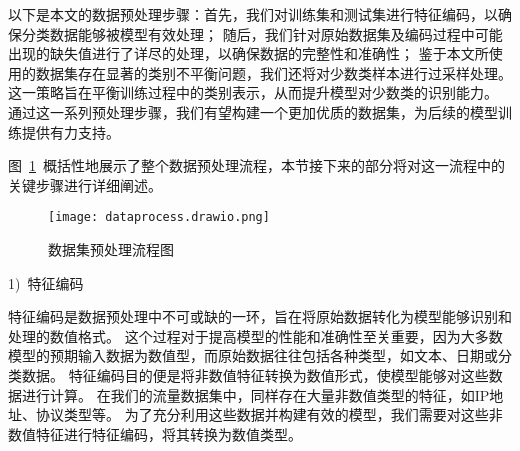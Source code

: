 以下是本文的数据预处理步骤：首先，我们对训练集和测试集进行特征编码，以确保分类数据能够被模型有效处理；
随后，我们针对原始数据集及编码过程中可能出现的缺失值进行了详尽的处理，以确保数据的完整性和准确性；
鉴于本文所使用的数据集存在显著的类别不平衡问题，我们还将对少数类样本进行过采样处理。
这一策略旨在平衡训练过程中的类别表示，从而提升模型对少数类的识别能力。
通过这一系列预处理步骤，我们有望构建一个更加优质的数据集，为后续的模型训练提供有力支持。\par

图~\ref{fig:dataprocess}~概括性地展示了整个数据预处理流程，本节接下来的部分将对这一流程中的关键步骤进行详细阐述。
\begin{figure}[htbp]
	\centering
	\texttt{[image: dataprocess.drawio.png]}
	\caption{数据集预处理流程图}
	\label{fig:dataprocess}
\end{figure}

1)~特征编码\par

特征编码是数据预处理中不可或缺的一环，旨在将原始数据转化为模型能够识别和处理的数值格式。
这个过程对于提高模型的性能和准确性至关重要，因为大多数模型的预期输入数据为数值型，而原始数据往往包括各种类型，如文本、日期或分类数据。
特征编码目的便是将非数值特征转换为数值形式，使模型能够对这些数据进行计算。
在我们的流量数据集中，同样存在大量非数值类型的特征，如IP地址、协议类型等。
为了充分利用这些数据并构建有效的模型，我们需要对这些非数值特征进行特征编码，将其转换为数值类型。\par

